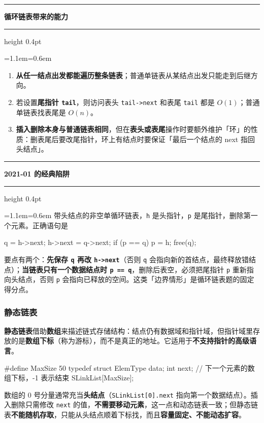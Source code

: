 \documentclass[11pt,openany,UTF8]{ctexbook}
\newcommand{\callouthead}[2]{%
  \par\addvspace{7pt}\noindent
  {\color{#1}\rule[-0.15em]{3pt}{1.05em}}\hspace{0.5em}%
  {\bfseries\color{#1}#2}\par\nobreak\vspace{-0.35em}%
  {\color{rulesep}\hrule height 0.4pt}\nobreak\vspace{0.45em}%
  \begingroup\small\setlength{\parindent}{0pt}%
  \leftskip=1.1em\rightskip=0.6em\noindent\ignorespaces}
\newcommand{\calloutend}{\par\endgroup\addvspace{7pt}}
\newenvironment{callkey}[1]{\callouthead{keybar}{#1}}{\calloutend}
\newenvironment{callexam}[1]{\callouthead{exambar}{#1}}{\calloutend}
\begin{document}
\begin{callkey}{循环链表带来的能力}
\begin{enumerate}
\item \textbf{从任一结点出发都能遍历整条链表}；普通单链表从某结点出发只能走到后继方向。
\item 若设置\textbf{尾指针 \texttt{tail}}，则访问表头 \texttt{tail->\allowbreak{}next} 和表尾 \texttt{tail} 都是 $O(1)$；普通单链表找表尾是 $O(n)$。
\item \textbf{插入删除本身与普通链表相同}，但在\textbf{表头或表尾}操作时要额外维护「环」的性质：删表尾后要改尾指针，环上有结点时要保证「最后一个结点的 next 指回头结点」。
\end{enumerate}
\end{callkey}

\begin{callexam}{2021-01 的经典陷阱}
带头结点的非空单循环链表，\texttt{h} 是头指针，\texttt{p} 是尾指针，删除第一个元素。正确语句是

\begin{codebox}
q = h->next; h->next = q->next; if (p == q) p = h; free(q);
\end{codebox}

要点有两个：\textbf{先保存 \texttt{q} 再改 \texttt{h->\allowbreak{}next}}（否则 \texttt{q} 会指向新的首结点，最终释放错结点）；\textbf{当链表只有一个数据结点时 \texttt{p =\allowbreak{}=\allowbreak{} q}}，删除后表空，必须把尾指针 \texttt{p} 重新指向头结点，否则 \texttt{p} 会指向已释放的空间。这类「边界情形」是循环链表题的固定得分点。

\end{callexam}

\subsubsection{静态链表}

\textbf{静态链表}借助\textbf{数组}来描述链式存储结构：结点仍有数据域和指针域，但指针域里存放的是\textbf{数组下标}（称为游标），而不是真正的地址。它适用于\textbf{不支持指针的高级语言}。

\begin{codebox}
#define MaxSize 50
typedef struct {
    ElemType data;
    int next;          // 下一个元素的数组下标，-1 表示结束
} SLinkList[MaxSize];
\end{codebox}

数组的 0 号分量通常充当\textbf{头结点}（\texttt{SLinkList[0]\allowbreak{}.next} 指向第一个数据结点）。插入删除只需修改 \texttt{next} 的值，\textbf{不需要移动元素}，这一点和动态链表一致；但静态链表\textbf{不能随机存取}，只能从头结点顺着下标找，而且\textbf{容量固定、不能动态扩容}。
\end{document}
